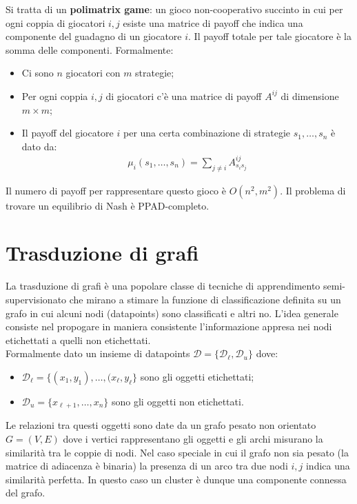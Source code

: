	Si tratta di un \textbf{polimatrix game}: un gioco non-cooperativo succinto in cui per ogni coppia di giocatori $i, j$ esiste una matrice di payoff che indica una componente del guadagno di un giocatore $i$. Il payoff totale per tale giocatore è la somma delle componenti. Formalmente:
	\begin{itemize}
		\item Ci sono $n$ giocatori con $m$ strategie;
		\item Per ogni coppia $i, j$ di giocatori c'è una matrice di payoff $A^{ij}$ di dimensione $m \times m$;
		\item Il payoff del giocatore $i$ per una certa combinazione di strategie $s_1, \dots, s_n$ è dato da:
		\begin{align*}
			\mu_i(s_1,\dots,s_n) = \sum_{j \neq i} A^{ij}_{s_i s_j}
		\end{align*}
	\end{itemize}
	Il numero di payoff per rappresentare questo gioco è $O(n^2, m^2)$. Il problema di trovare un equilibrio di Nash è PPAD-completo.
	
	
	\newpage
	
	
	\section{Trasduzione di grafi} %
	\label{sec:trasduzione_di_grafi}
	La trasduzione di grafi è una popolare classe di tecniche di apprendimento semi-supervisionato che mirano a stimare la funzione di classificazione definita su un grafo in cui alcuni nodi (datapoints) sono classificati e altri no. L'idea generale consiste nel propogare in maniera consistente l'informazione appresa nei nodi etichettati a quelli non etichettati.\\
	
	Formalmente dato un insieme di datapoints $\mathcal{D} = \{\mathcal{D}_\ell, \mathcal{D}_u\}$ dove:
	\begin{itemize}
		\item $\mathcal{D}_\ell = \{(x_1, y_1), \dots, (x_\ell, y_\ell\}$ sono gli oggetti etichettati;
		\item $\mathcal{D}_u = \{x_{\ell + 1}, \dots, x_n\}$ sono gli oggetti non etichettati.
	\end{itemize}
	Le relazioni tra questi oggetti sono date da un grafo pesato non orientato $G=(V,E)$ dove i vertici rappresentano gli oggetti e gli archi misurano la similarità tra le coppie di nodi. Nel caso speciale in cui il grafo non sia pesato (la matrice di adiacenza è binaria) la presenza di un arco tra due nodi $i, j$ indica una similarità perfetta. In questo caso un cluster è dunque una componente connessa del grafo.\\
	
